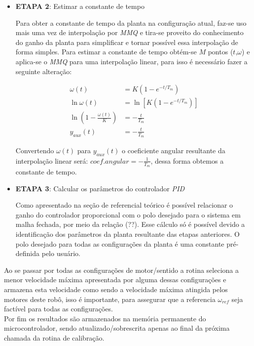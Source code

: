 \begin{itemize}
    \item \textbf{ETAPA 2}: Estimar a constante de tempo
    
    Para obter a constante de tempo da planta na configuração atual, faz-se uso mais uma vez de interpolação por \textit{MMQ} e tira-se proveito do conhecimento do ganho da planta para simplificar e tornar possível essa interpolação de forma simples. Para estimar a constante de tempo obtém-se $M$ pontos ($t$,$\omega$) e aplica-se o \textit{MMQ} para uma interpolação linear, para isso é necessário fazer a seguinte alteração:
        

    \begin{align*}
        \omega(t) &= K\left( 1 - e^{-t/T_m} \right)\\
        \ln{\omega(t)} &= \ln\left[K( 1 - e^{-t/T_m})\right]\\
        \ln\left(1 - \frac{\omega(t)}{K} \right) &= -\frac{t}{T_m}\\
        y_{aux}(t) &= -\frac{t}{T_m}
    \end{align*}
    
    Convertendo $\omega(t)$ para $y_{aux}(t)$ o coeficiente angular resultante da interpolação linear será: $coef.angular = -\frac{1}{T_m}$, dessa forma obtemos a constante de tempo.
    
    \item \textbf{ETAPA 3}: Calcular os parâmetros do controlador \textit{PID}
    
    Como apresentado na seção de referencial teórico é possível relacionar o ganho do controlador proporcional com o polo desejado para o sistema em malha fechada, por meio da relação (??). Esse cálculo só é possível devido a identificação dos parâmetros da planta resultante das etapas anteriores. O polo desejado para todas as configurações da planta é uma constante pré-definida pelo usuário.
    
\end{itemize}

Ao se passar por todas as configurações de motor/sentido a rotina seleciona a menor velocidade máxima apresentada por alguma dessas configurações e armazena esta velocidade como sendo a velocidade máxima atingida pelos motores deste robô, isso é importante, para assegurar que a referencia $\omega_{ref}$ seja factível para todas as configurações. \\

Por fim os resultados são armazenados na memória permanente do microcontrolador, sendo atualizado/sobrescrita apenas ao final da próxima chamada da rotina de calibração.

